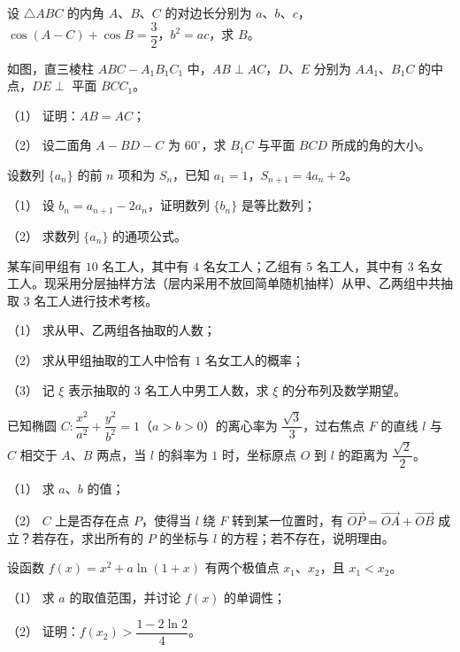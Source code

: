\begin{question}
设 $\triangle ABC$ 的内角 $A\text{、}B\text{、}C$ 的对边长分别为 $a\text{、}b\text{、}c$，$\cos(A-C)+\cos B=\dfrac32$，$b^2=ac$，求 $B$。

\Needspace{0.4\textheight}
\end{question}
\begin{question}
如图，直三棱柱 $ABC-A_1B_1C_1$ 中，$AB\perp AC$，$D\text{、}E$ 分别为 $AA_1\text{、}B_1C$ 的中点，$DE\perp$ 平面 $BCC_1$。
\nopagebreak[4]
\begin{center}\end{center}
\nopagebreak[4]
（1） 证明：$AB=AC$；

（2） 设二面角 $A-BD-C$ 为 $60^\circ$，求 $B_1C$ 与平面 $BCD$ 所成的角的大小。

\end{question}
\begin{question}
设数列 $\{a_n\}$ 的前 $n$ 项和为 $S_n$，已知 $a_1=1$，$S_{n+1}=4a_n+2$。

（1） 设 $b_n=a_{n+1}-2a_n$，证明数列 $\{b_n\}$ 是等比数列；

（2） 求数列 $\{a_n\}$ 的通项公式。

\end{question}
\begin{question}
某车间甲组有 $10$ 名工人，其中有 $4$ 名女工人；乙组有 $5$ 名工人，其中有 $3$ 名女工人。现采用分层抽样方法（层内采用不放回简单随机抽样）从甲、乙两组中共抽取 $3$ 名工人进行技术考核。

（1） 求从甲、乙两组各抽取的人数；

（2） 求从甲组抽取的工人中恰有 $1$ 名女工人的概率；

（3） 记 $\xi$ 表示抽取的 $3$ 名工人中男工人数，求 $\xi$ 的分布列及数学期望。

\end{question}
\begin{question}
已知椭圆 $C:\dfrac{x^2}{a^2}+\dfrac{y^2}{b^2}=1$（$a>b>0$）的离心率为 $\dfrac{\sqrt3}{3}$，过右焦点 $F$ 的直线 $l$ 与 $C$ 相交于 $A\text{、}B$ 两点，当 $l$ 的斜率为 $1$ 时，坐标原点 $O$ 到 $l$ 的距离为 $\dfrac{\sqrt2}{2}$。

（1） 求 $a\text{、}b$ 的值；

（2） $C$ 上是否存在点 $P$，使得当 $l$ 绕 $F$ 转到某一位置时，有 $\overrightarrow{OP}=\overrightarrow{OA}+\overrightarrow{OB}$ 成立？若存在，求出所有的 $P$ 的坐标与 $l$ 的方程；若不存在，说明理由。

\end{question}
\begin{question}
设函数 $f(x)=x^2+a\ln(1+x)$ 有两个极值点 $x_1\text{、}x_2$，且 $x_1<x_2$。

（1） 求 $a$ 的取值范围，并讨论 $f(x)$ 的单调性；

（2） 证明：$f(x_2)>\dfrac{1-2\ln2}{4}$。

\end{question}